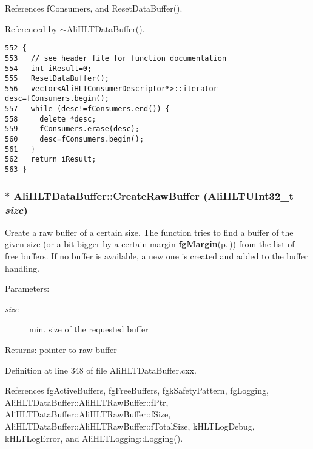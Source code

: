 References f\-Consumers, and Reset\-Data\-Buffer().

Referenced by $\sim$Ali\-HLTData\-Buffer().

\footnotesize\begin{verbatim}552 {
553   // see header file for function documentation
554   int iResult=0;
555   ResetDataBuffer();
556   vector<AliHLTConsumerDescriptor*>::iterator desc=fConsumers.begin();
557   while (desc!=fConsumers.end()) {
558     delete *desc;
559     fConsumers.erase(desc);
560     desc=fConsumers.begin();
561   }
562   return iResult;
563 }
\end{verbatim}\normalsize 


\subsubsection{ $\ast$ Ali\-HLTData\-Buffer::Create\-Raw\-Buffer ({\bf Ali\-HLTUInt32\_\-t} {\em size})\hspace{0.3cm}{\tt  [static, private]}}\label{classAliHLTDataBuffer_h0}


Create a raw buffer of a certain size. The function tries to find a buffer of the given size (or a bit bigger by a certain margin {\bf fg\-Margin}{\rm (p.\,\pageref{classAliHLTDataBuffer_v3})}) from the list of free buffers. If no buffer is available, a new one is created and added to the buffer handling. \begin{Desc}
\item[Parameters:]
\begin{description}
\item[{\em size}]min. size of the requested buffer \end{description}
\end{Desc}
\begin{Desc}
\item[Returns:]pointer to raw buffer \end{Desc}


Definition at line 348 of file Ali\-HLTData\-Buffer.cxx.

References fg\-Active\-Buffers, fg\-Free\-Buffers, fgk\-Safety\-Pattern, fg\-Logging, Ali\-HLTData\-Buffer::Ali\-HLTRaw\-Buffer::f\-Ptr, Ali\-HLTData\-Buffer::Ali\-HLTRaw\-Buffer::f\-Size, Ali\-HLTData\-Buffer::Ali\-HLTRaw\-Buffer::f\-Total\-Size, k\-HLTLog\-Debug, k\-HLTLog\-Error, and Ali\-HLTLogging::Logging().

